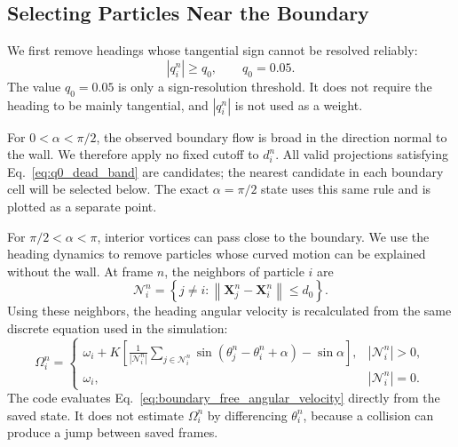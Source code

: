 \documentclass[11pt]{article}
\numberwithin{equation}{section}
\begin{document}
\subsection{Selecting Particles Near the Boundary}

We first remove headings whose tangential sign cannot be resolved reliably:
\begin{equation}
  |q_i^n|\ge q_0,
  \qquad q_0=0.05.
  \label{eq:q0_dead_band}
\end{equation}
The value $q_0=0.05$ is only a sign-resolution threshold.  It does not require
the heading to be mainly tangential, and $|q_i^n|$ is not used as a weight.

For $0<\alpha<\pi/2$, the observed boundary flow is broad in the direction
normal to the wall.  We therefore apply no fixed cutoff to $d_i^n$.  All valid
projections satisfying Eq.~\eqref{eq:q0_dead_band} are candidates; the nearest
candidate in each boundary cell will be selected below.  The exact
$\alpha=\pi/2$ state uses this same rule and is plotted as a separate point.

For $\pi/2<\alpha<\pi$, interior vortices can pass close to the boundary.  We
use the heading dynamics to remove particles whose curved motion can be
explained without the wall.  At frame $n$, the neighbors of particle $i$ are
\begin{equation}
  \mathcal N_i^n=
  \left\{j\ne i:
  \left\|\mathbf X_j^n-\mathbf X_i^n\right\|\le d_0\right\}.
  \label{eq:boundary_neighbor_set}
\end{equation}
Using these neighbors, the heading angular velocity is recalculated from the
same discrete equation used in the simulation:
\begin{equation}
  \Omega_i^n=
  \begin{cases}
  \displaystyle
  \omega_i+K\left[
  \frac{1}{|\mathcal N_i^n|}
  \sum_{j\in\mathcal N_i^n}
  \sin(\theta_j^n-\theta_i^n+\alpha)-\sin\alpha
  \right],
  & |\mathcal N_i^n|>0,\\[1.1em]
  \omega_i,& |\mathcal N_i^n|=0.
  \end{cases}
  \label{eq:boundary_free_angular_velocity}
\end{equation}
The code evaluates Eq.~\eqref{eq:boundary_free_angular_velocity} directly from
the saved state.  It does not estimate $\Omega_i^n$ by differencing
$\theta_i^n$, because a collision can produce a jump between saved frames.
\end{document}
